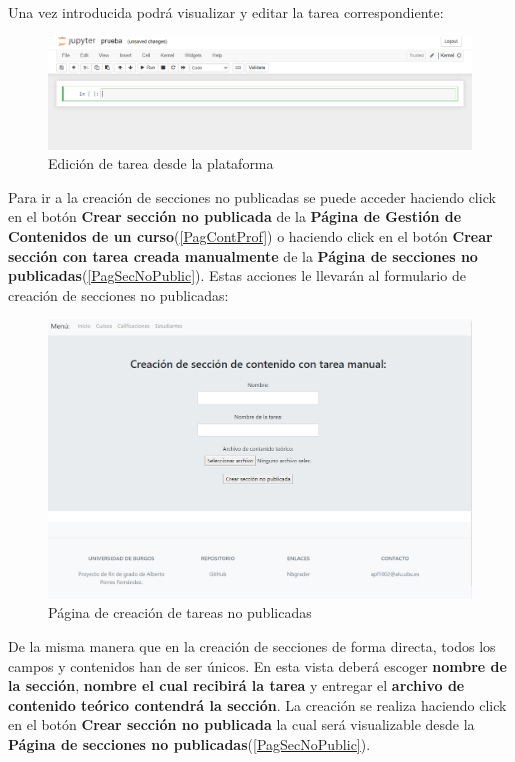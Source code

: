 Una vez introducida podrá visualizar y editar la tarea correspondiente:
\begin{figure}[H]
\centering
\includegraphics[width=\textwidth]{img/imgs-memoria/EdicionTareaDirecta.PNG}
\caption{Edición de tarea desde la plataforma}
\end{figure}

Para ir a la creación de secciones no publicadas se puede acceder haciendo click en el botón \textbf{Crear sección no publicada} de la \textbf{Página de Gestión de Contenidos de un curso}(\ref{PagContProf}) o haciendo click en el botón \textbf{Crear sección con tarea creada manualmente} de la \textbf{Página de secciones no publicadas}(\ref{PagSecNoPublic}). Estas acciones le llevarán al formulario de creación de secciones no publicadas:

\begin{figure}[H]
\centering
\includegraphics[width=\textwidth]{img/imgs-memoria/CrearUnreleasedSection.PNG}
\caption{Página de creación de tareas no publicadas}
\end{figure}

De la misma manera que en la creación de secciones de forma directa, todos los campos y contenidos han de ser únicos. En esta vista deberá escoger \textbf{nombre de la sección}, \textbf{nombre el cual recibirá la tarea} y entregar el \textbf{archivo de contenido teórico contendrá la sección}. La creación se realiza haciendo click en el botón \textbf{Crear sección no publicada} la cual será visualizable desde la \textbf{Página de secciones no publicadas}(\ref{PagSecNoPublic}).



